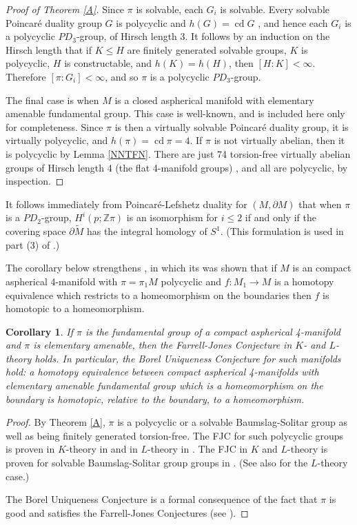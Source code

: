 \documentclass[12pt]{amsart}
\renewcommand{\leq}{\leqslant}
\newtheorem{corollary}[theorem]{Corollary}
\theoremstyle{definition}
\newcommand{\Z}{\mathbb Z}
\DeclareMathOperator{\cd}{cd}
\begin{document}
\begin{proof}[Proof of Theorem \ref{A}]
Since $\pi$ is solvable,  each $G_i$ is solvable. 
Every solvable Poincar\'e duality group $G$ is polycyclic
and $h(G)=\cd G$ \cite{Bieri},
and hence each $G_i$ is a polycyclic $PD_3$-group,
of Hirsch length 3.
It follows by an induction on the Hirsch length that if
$K\leq{H}$ are finitely generated solvable groups, $K$ is polycyclic, 
$H$ is constructable, and $h(K)=h(H)$, then $[H:K]<\infty$.
Therefore $[\pi:G_i]<\infty$, and so $\pi$ is a polycyclic $PD_3$-group.   

The final case is when $M$ is a closed aspherical manifold 
with elementary amenable fundamental group.   
This case is well-known, 
and is included here only for completeness.   
Since $\pi$ is then a virtually solvable Poincar\'e duality group,
it is virtually polycyclic, and $h(\pi)=\cd\pi=4$.
If $\pi$ is not virtually abelian, then it
is polycyclic by Lemma \ref{NNTFN}.
There are just 74 torsion-free virtually abelian groups 
of Hirsch length 4 (the flat 4-manifold groups) \cite{HiF}, 
and all are polycyclic, by inspection.  
\end{proof}

It follows immediately from Poincar\'e-Lefshetz duality for $(M,\partial{M})$
that when $\pi$ is a $PD_2$-group,   $H^i(p;\Z\pi)$ is an isomorphism
for $i\leq2$ if and only if the covering space $\partial\widetilde{M}$ 
has the integral homology of $S^1$.
(This formulation is used in part (3) of \cite[Corollary 23]{dh1}.)

The corollary below strengthens  \cite[Chapter 11.\S5]{FQ},
in which its was shown that if $M$ is an compact aspherical 4-manifold 
with $\pi=\pi_1M$ polycyclic and $f:M_1\to{M}$ is a homotopy equivalence 
which restricts to a homeomorphism on the boundaries then $f$ is 
homotopic to a homeomorphism.

\begin{corollary} \label{FJC for EA in dim 4}
If $\pi$ is the fundamental group of a compact aspherical 4-manifold and $\pi$ is elementary amenable, then the Farrell-Jones Conjecture in $K$- and $L$-theory holds.  In particular, the Borel Uniqueness Conjecture for such manifolds hold: a homotopy equivalence between compact aspherical 4-manifolds with elementary amenable fundamental group which is a homeomorphism on the boundary is homotopic, relative to the boundary, to a homeomorphism.
\end{corollary}

\begin{proof}
By Theorem \ref{A}, $\pi$ is a polycyclic or a solvable Baumslag-Solitar group as well as being finitely generated torsion-free.   The FJC for such polycyclic groups is proven in $K$-theory in \cite{FH81} and in $L$-theory in \cite{FJ88}.  The FJC  in $K$ and $L$-theory is proven for solvable Baumslag-Solitar group groups in \cite{FW14}. (See also \cite{St87} for the $L$-theory case.)

The Borel Uniqueness Conjecture is a formal consequence of the fact that $\pi$ is good and satisfies the Farrell-Jones Conjectures  (see \cite{dh1}).
\end{proof}
\end{document}
